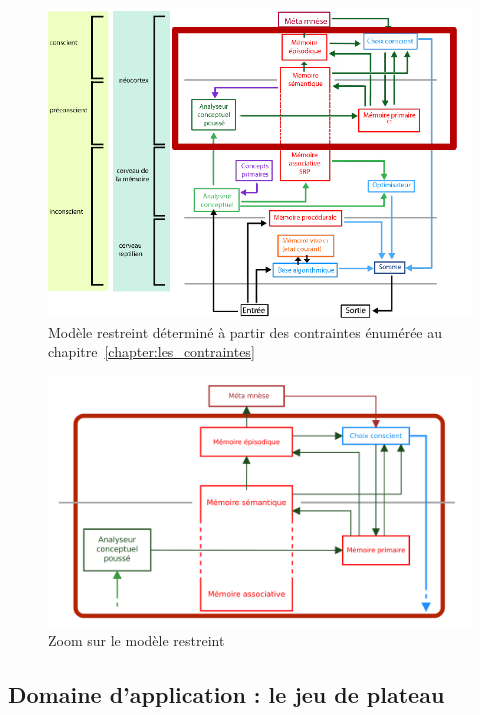 \begin{figure}[H] 
\includegraphics[width=\textwidth]{files/modele_restreint} 
\caption{Modèle restreint déterminé à partir des contraintes énumérée au chapitre~\ref{chapter:les_contraintes}} 
\label{modele_restreint}
\end{figure}

\begin{figure}[H] 
\includegraphics[width=\textwidth]{files/restricted_model_french} 
\caption{Zoom sur le  modèle restreint} 
\label{zoom_modele_restreint}
\end{figure}

\subsection{Domaine d'application : le jeu de plateau}
\label{section:domaine_application_le_jeu_de_plateau}


